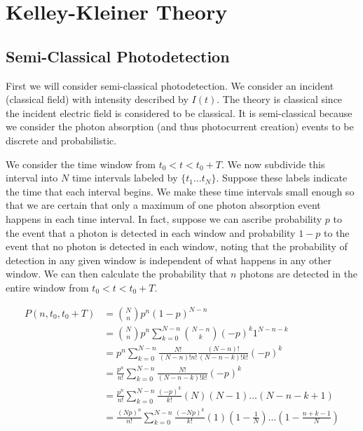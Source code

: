 \documentclass[12pt]{article}
\begin{document}
\section{Kelley-Kleiner Theory}

\subsection{Semi-Classical Photodetection}

First we will consider semi-classical photodetection. We consider an incident (classical field) with intensity described by $I(t)$. The theory is classical since the incident electric field is considered to be classical. It is semi-classical because we consider the photon absorption (and thus photocurrent creation) events to be discrete and probabilistic. 

We consider the time window from $t_0<t<t_0+T$. We now subdivide this interval into $N$ time intervals labeled by $\{t_1 \ldots t_N\}$. Suppose these labels indicate the time that each interval begins. We make these time intervals small enough so that we are certain that only a maximum of one photon absorption event happens in each time interval. In fact, suppose we can ascribe probability $p$ to the event that a photon is detected in each window and probability $1-p$ to the event that no photon is detected in each window, noting that the probability of detection in any given window is independent of what happens in any other window. We can then calculate the probability that $n$ photons are detected in the entire window from $t_0<t<t_0+T$.

\begin{align}
P(n,t_0,t_0+T) &= \binom{N}{n} p^n(1-p)^{N-n}\\
&=\binom{N}{n} p^n \sum_{k=0}^{N-n} \binom{N-n}{k} (-p)^{k} 1^{N-n-k}\\
&= p^n\sum_{k=0}^{N-n} \frac{N!}{(N-n)!n!} \frac{(N-n)!}{(N-n-k)!k!}(-p)^{k}\\
&= \frac{p^n}{n!}\sum_{k=0}^{N-n} \frac{N!}{(N-n-k)!k!} (-p)^{k}\\
&= \frac{p^n}{n!} \sum_{k=0}^{N-n} \frac{(-p)^k}{k!} (N)(N-1)\ldots(N-n-k+1)\\
&= \frac{(Np)^n}{n!} \sum_{k=0}^{N-n} \frac{(-Np)^k}{k!}\left(1\right) \left(1-\frac{1}{N}\right) \ldots \left(1 - \frac{n+k-1}{N} \right)
\end{align}
\end{document}
